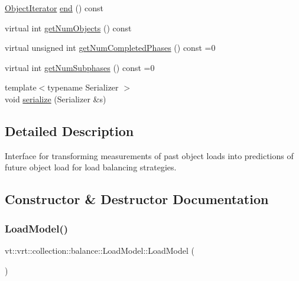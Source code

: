 \begin{DoxyCompactItemize}
\item 
\hyperlink{structvt_1_1vrt_1_1collection_1_1balance_1_1_object_iterator}{Object\+Iterator} \hyperlink{structvt_1_1vrt_1_1collection_1_1balance_1_1_load_model_a2b3212a8438a4b58a73c41db841f15b7}{end} () const
\item 
virtual int \hyperlink{structvt_1_1vrt_1_1collection_1_1balance_1_1_load_model_a438cd95f1c60b4232152335c4ee950bc}{get\+Num\+Objects} () const
\item 
virtual unsigned int \hyperlink{structvt_1_1vrt_1_1collection_1_1balance_1_1_load_model_abba98976118ff797fc2393a50e3e80d8}{get\+Num\+Completed\+Phases} () const =0
\item 
virtual int \hyperlink{structvt_1_1vrt_1_1collection_1_1balance_1_1_load_model_aa7ddeca4fc8de99bc25a895e207de2e6}{get\+Num\+Subphases} () const =0
\item 
{\footnotesize template$<$typename Serializer $>$ }\\void \hyperlink{structvt_1_1vrt_1_1collection_1_1balance_1_1_load_model_a52e2210225947697a235b75c385eb104}{serialize} (Serializer \&s)
\end{DoxyCompactItemize}


\subsection{Detailed Description}
Interface for transforming measurements of past object loads into predictions of future object load for load balancing strategies. 

\subsection{Constructor \& Destructor Documentation}
\mbox{\label{structvt_1_1vrt_1_1collection_1_1balance_1_1_load_model_a90f345e752441d66b2893027f2626226}} 
\subsubsection{\texorpdfstring{Load\+Model()}{LoadModel()}}
{\footnotesize\ttfamily vt\+::vrt\+::collection\+::balance\+::\+Load\+Model\+::\+Load\+Model (\begin{DoxyParamCaption}{ }\end{DoxyParamCaption})\hspace{0.3cm}{\ttfamily [default]}}

